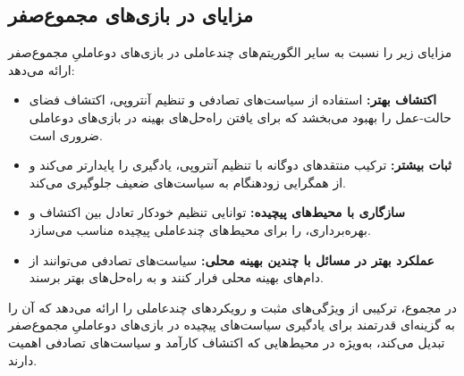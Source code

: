 \subsection{مزایای  در بازی‌های مجموع­‌صفر}

 مزایای زیر را نسبت به سایر الگوریتم‌های چند­عاملی در بازی‌های دو­عاملیِ مجموع­‌صفر ارائه می‌دهد:

\begin{itemize}
    \item \textbf{اکتشاف بهتر:} استفاده از سیاست‌های تصادفی و تنظیم آنتروپی، اکتشاف فضای حالت-عمل را بهبود می‌بخشد که برای یافتن راه‌حل‌های بهینه در بازی‌های دو­عاملی ضروری است.
    \item \textbf{ثبات بیشتر:} ترکیب منتقدهای دوگانه با تنظیم آنتروپی، یادگیری را پایدارتر می‌کند و از همگرایی زودهنگام به سیاست‌های ضعیف جلوگیری می‌کند.
    \item \textbf{سازگاری با محیط‌های پیچیده:} توانایی تنظیم خودکار تعادل بین اکتشاف و بهره‌برداری،  را برای محیط‌های چند­عاملی پیچیده مناسب می‌سازد.
    \item \textbf{عملکرد بهتر در مسائل با چندین بهینه محلی:} سیاست‌های تصادفی می‌توانند از دام‌های بهینه محلی فرار کنند و به راه‌حل‌های بهتر برسند.
\end{itemize}

در مجموع،  ترکیبی از ویژگی‌های مثبت  و رویکردهای چند­عاملی را ارائه می‌دهد که آن را به گزینه‌ای قدرتمند برای یادگیری سیاست‌های پیچیده در بازی‌های دو­عاملیِ مجموع­‌صفر تبدیل می‌کند، به‌ویژه در محیط‌هایی که اکتشاف کارآمد و سیاست‌های تصادفی اهمیت دارند.
